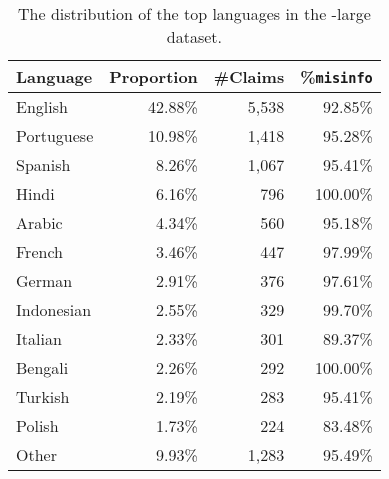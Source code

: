 \documentclass[sigconf,natbib=true,anonymous=false,nonacm]{acmart}
\begin{document}
\begin{table}[H]
    \caption{The distribution of the top languages in the \datasetname-large
    dataset.}
    \begin{center}
        \begin{tabular}{lrrr}
            \toprule
            \textbf{Language} &
            \textbf{Proportion} &
            \textbf{\#Claims} &
            \textbf{\%\texttt{misinfo}} \\

            \midrule

            English & 42.88\% & 5,538 & 92.85\% \\
            Portuguese & 10.98\% & 1,418 & 95.28\% \\
            Spanish & 8.26\% & 1,067 & 95.41\% \\
            Hindi & 6.16\% & 796 & 100.00\% \\
            Arabic & 4.34\% & 560 & 95.18\% \\
            French & 3.46\% & 447 & 97.99\% \\
            German & 2.91\% & 376 & 97.61\% \\
            Indonesian & 2.55\% & 329 & 99.70\% \\
            Italian & 2.33\% & 301 & 89.37\% \\
            Bengali & 2.26\% & 292 & 100.00\% \\
            Turkish & 2.19\% & 283 & 95.41\% \\
            Polish & 1.73\% & 224 & 83.48\% \\
            Other & 9.93\% & 1,283 & 95.49\% \\
            \bottomrule
        \end{tabular}
        \label{tab:muminlargestats}
    \end{center}
\end{table}
\end{document}
